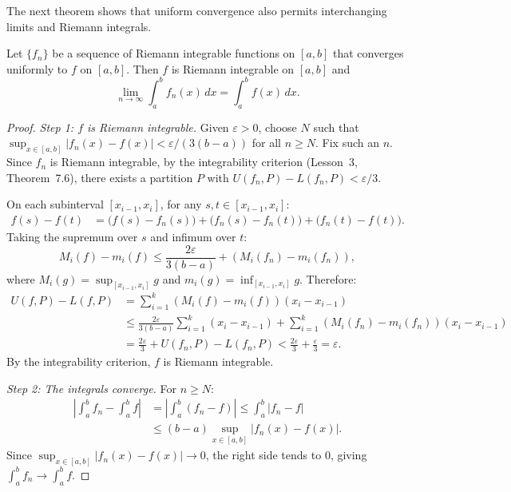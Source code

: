\documentclass[11pt,a4paper]{article}
\begin{document}
The next theorem shows that uniform convergence also permits
interchanging limits and Riemann integrals.

\begin{theorem}
\label{thm:interchange_limit_integral}
Let $\{f_n\}$ be a sequence of Riemann integrable functions on $[a, b]$
that converges uniformly to $f$ on $[a, b]$. Then $f$ is Riemann
integrable on $[a, b]$ and
\[
  \lim_{n \to \infty} \int_a^b f_n(x)\,dx = \int_a^b f(x)\,dx.
\]
\end{theorem}

\begin{proof}
\emph{Step 1: $f$ is Riemann integrable.} Given $\varepsilon > 0$,
choose $N$ such that $\sup_{x \in [a,b]} |f_n(x) - f(x)| <
\varepsilon / (3(b - a))$ for all $n \ge N$. Fix such an $n$. Since
$f_n$ is Riemann integrable, by the integrability criterion (Lesson~3,
Theorem~7.6), there exists a partition $P$ with
$U(f_n, P) - L(f_n, P) < \varepsilon/3$.

On each subinterval $[x_{i-1}, x_i]$, for any $s, t \in [x_{i-1}, x_i]$:
\begin{align*}
  f(s) - f(t) &= \bigl(f(s) - f_n(s)\bigr) + \bigl(f_n(s) - f_n(t)\bigr)
  + \bigl(f_n(t) - f(t)\bigr).
\end{align*}
Taking the supremum over $s$ and infimum over $t$:
\[
  M_i(f) - m_i(f) \le \frac{2\varepsilon}{3(b-a)} + (M_i(f_n) - m_i(f_n)),
\]
where $M_i(g) = \sup_{[x_{i-1}, x_i]} g$ and
$m_i(g) = \inf_{[x_{i-1}, x_i]} g$. Therefore:
\begin{align*}
  U(f, P) - L(f, P)
  &= \sum_{i=1}^k (M_i(f) - m_i(f))(x_i - x_{i-1}) \\
  &\le \frac{2\varepsilon}{3(b-a)} \sum_{i=1}^k (x_i - x_{i-1})
  + \sum_{i=1}^k (M_i(f_n) - m_i(f_n))(x_i - x_{i-1}) \\
  &= \frac{2\varepsilon}{3} + U(f_n, P) - L(f_n, P)
  < \frac{2\varepsilon}{3} + \frac{\varepsilon}{3} = \varepsilon.
\end{align*}
By the integrability criterion, $f$ is Riemann integrable.

\emph{Step 2: The integrals converge.} For $n \ge N$:
\begin{align*}
  \left|\int_a^b f_n - \int_a^b f\right|
  &= \left|\int_a^b (f_n - f)\right|
  \le \int_a^b |f_n - f| \\
  &\le (b - a) \sup_{x \in [a,b]} |f_n(x) - f(x)|.
\end{align*}
Since $\sup_{x \in [a,b]} |f_n(x) - f(x)| \to 0$, the right side
tends to $0$, giving $\int_a^b f_n \to \int_a^b f$.
\end{proof}
\end{document}
